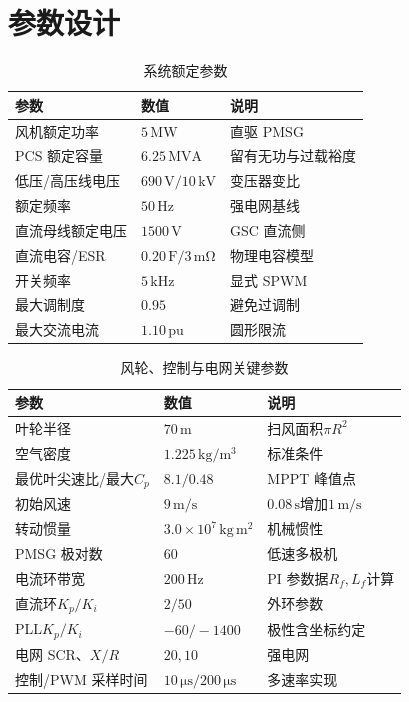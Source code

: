 \documentclass[UTF8,zihao=-4,fontset=none]{ctexrep}
\newcommand{\pu}{\mathrm{pu}}
\begin{document}
\chapter{参数设计}
\begin{table}[H]
\centering
\caption{系统额定参数}
\begin{tabular}{p{5.2cm}p{3.2cm}p{4.0cm}}
\toprule
参数 & 数值 & 说明\\
\midrule
风机额定功率 & \(5\,\mathrm{MW}\) & 直驱 PMSG\\
PCS 额定容量 & \(6.25\,\mathrm{MVA}\) & 留有无功与过载裕度\\
低压/高压线电压 & \(690\,\mathrm{V}/10\,\mathrm{kV}\) & 变压器变比\\
额定频率 & \(50\,\mathrm{Hz}\) & 强电网基线\\
直流母线额定电压 & \(1500\,\mathrm{V}\) & GSC 直流侧\\
直流电容/ESR & \(0.20\,\mathrm{F}/3\,\mathrm{m\Omega}\) & 物理电容模型\\
开关频率 & \(5\,\mathrm{kHz}\) & 显式 SPWM\\
最大调制度 & \(0.95\) & 避免过调制\\
最大交流电流 & \(1.10\,\pu\) & 圆形限流\\
\bottomrule
\end{tabular}
\end{table}

\begin{table}[H]
\centering
\caption{风轮、控制与电网关键参数}
\begin{tabular}{p{5.4cm}p{3.2cm}p{3.8cm}}
\toprule
参数 & 数值 & 说明\\
\midrule
叶轮半径 & \(70\,\mathrm{m}\) & 扫风面积\(\pi R^2\)\\
空气密度 & \(1.225\,\mathrm{kg/m^3}\) & 标准条件\\
最优叶尖速比/最大\(C_p\) & \(8.1/0.48\) & MPPT 峰值点\\
初始风速 & \(9\,\mathrm{m/s}\) & \(0.08\,\mathrm{s}\)增加\(1\,\mathrm{m/s}\)\\
转动惯量 & \(3.0\times10^7\,\mathrm{kg\,m^2}\) & 机械惯性\\
PMSG 极对数 & \(60\) & 低速多极机\\
电流环带宽 & \(200\,\mathrm{Hz}\) & PI 参数据\(R_f,L_f\)计算\\
直流环\(K_p/K_i\) & \(2/50\) & 外环参数\\
PLL\(K_p/K_i\) & \(-60/-1400\) & 极性含坐标约定\\
电网 SCR、\(X/R\) & \(20,10\) & 强电网\\
控制/PWM 采样时间 & \(10\,\mathrm{\mu s}/200\,\mathrm{\mu s}\) & 多速率实现\\
\bottomrule
\end{tabular}
\end{table}
\end{document}
